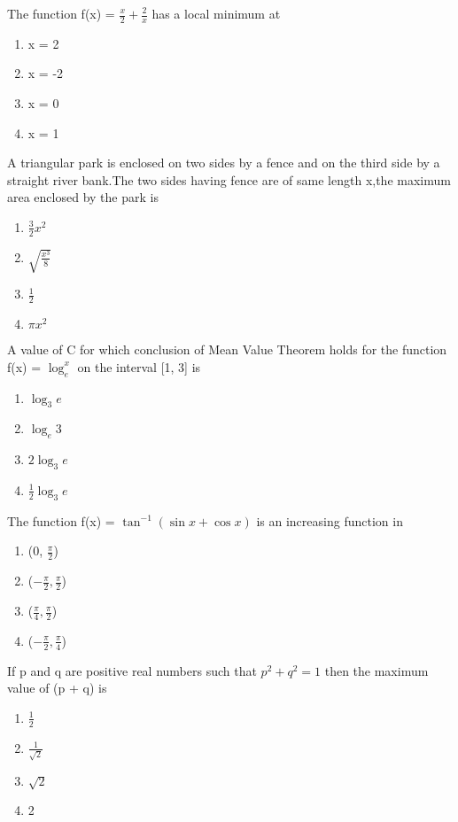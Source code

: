 \item The function f(x) = $\frac{x}{2} + \frac{2}{x}$ has a local minimum at
\begin{enumerate}
\item x = 2
\item x = -2
\item x = 0
\item x = 1
\end{enumerate}

\item A triangular park is enclosed on two sides by a fence and on the third side by a straight river bank.The two sides having fence are of same length x,the maximum area enclosed by the park is 
\begin{enumerate}
\item $\frac{3}{2}x^2$
\item $\sqrt{\frac{x^3}{8}}$
\item $\frac{1}{2}$
\item $\pi x^2$
\end{enumerate}

\item A value of C for which conclusion of Mean Value Theorem holds for the function f(x) = $\log_e^x$ on the interval [1, 3] is 
\begin{enumerate}
\item $\log_3 e$
\item $\log_e 3$
\item $2\log_3 e$
\item $\frac{1}{2}\log_3 e$
\end{enumerate}

\item The function f(x) = $\tan^{-1}(\sin x + \cos x)$ is an increasing function in 
\begin{enumerate}
\item (0, $\frac{\pi}{2}$)
\item ($-\frac{\pi}{2}, \frac{\pi}{2}$)
\item ($\frac{\pi}{4}, \frac{\pi}{2}$)
\item ($-\frac{\pi}{2}, \frac{\pi}{4}$)
\end{enumerate}

\item If p and q are positive real numbers such that $p^2 + q^2 = 1$ then the maximum value of (p + q) is
\begin{enumerate}
\item $\frac{1}{2}$
\item $\frac{1}{\sqrt{2}}$
\item $\sqrt{2}$
\item 2
\end{enumerate}

